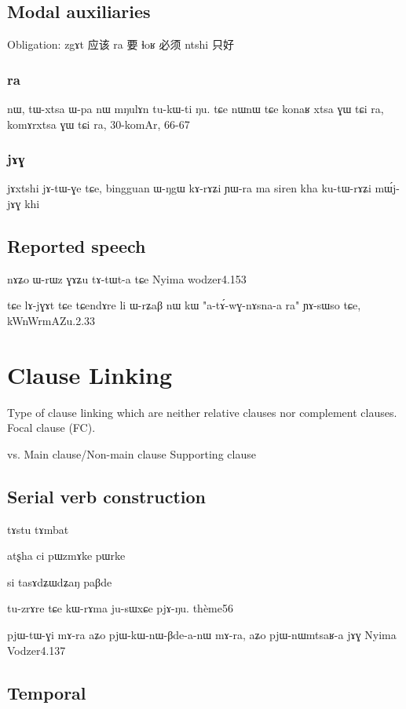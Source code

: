 \documentclass[oldfontcommands,oneside,a4paper,11pt]{memoir}
\newcommand{\wav}[1]{}%
\begin{document}
\section{Modal auxiliaries}
Obligation: zgɤt 应该 ra 要 ɬoʁ 必须 ntshi 只好

\subsection{ra}

 nɯ, tɯ-xtsa ɯ-pa nɯ mŋulɤn tu-kɯ-ti ŋu.
tɕe nɯnɯ tɕe konaʁ xtsa ɣɯ tɕi ra, 
komɤrxtsa ɣɯ tɕi ra,
30-komAr, 66-67

\subsection{jɤɣ}

jɤxtshi jɤ-tɯ-ɣe tɕe, bingguan ɯ-ŋgɯ kɤ-rɤʑi ɲɯ-ra ma siren kha ku-tɯ-rɤʑi mɯ́j-jɤɣ khi
\wav{mWjjAG}
\section{Reported speech}
nɤʑo ɯ-rɯz ɣɤʑu tɤ-tɯt-a tɕe
Nyima wodzer4.153


tɕe lɤ-jɣɤt tɕe tɕendɤre li ɯ-rʑaβ nɯ kɯ  "a-tɤ́-wɣ-nɤsna-a ra" ɲɤ-sɯso tɕe,
kWnWrmAZu.2.33

\chapter{Clause Linking}

Type of clause linking which are neither relative clauses nor complement clauses.
Focal clause (FC).

vs. Main clause/Non-main clause
 Supporting clause
\section{Serial verb construction} \label{sec:serial.verb}

tɤstu tɤmbat

atʂha ci pɯzmɤke pɯrke


si tasɤdʑɯdʑaŋ paβde


tu-zrɤre tɕe kɯ-rɤma ju-sɯxɕe pjɤ-ŋu.
thème56

pjɯ-tɯ-ɣi mɤ-ra
aʑo pjɯ-kɯ-nɯ-βde-a-nɯ mɤ-ra, aʑo pjɯ-nɯmtsaʁ-a jɤɣ
Nyima Vodzer4.137

\section{Temporal}
\end{document}
